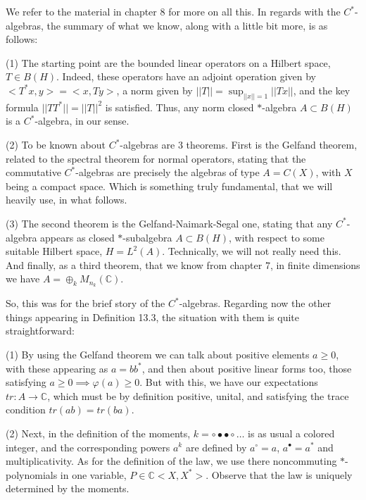 \documentclass[12pt]{amsbook}
\begin{document}
We refer to the material in chapter 8 for more on all this. In regards with the $C^*$-algebras, the summary of what we know, along with a little bit more, is as follows:

\bigskip

(1) The starting point are the bounded linear operators on a Hilbert space, $T\in B(H)$. Indeed, these operators have an adjoint operation given by $<T^*x,y>=<x,Ty>$, a norm given by $||T||=\sup_{||x||=1}||Tx||$, and the key formula $||TT^*||=||T||^2$ is satisfied. Thus, any norm closed $*$-algebra $A\subset B(H)$ is a $C^*$-algebra, in our sense.

\bigskip

(2) To be known about $C^*$-algebras are 3 theorems. First is the Gelfand theorem, related to the spectral theorem for normal operators, stating that the commutative $C^*$-algebras are precisely the algebras of type $A=C(X)$, with $X$ being a compact space. Which is something truly fundamental, that we will heavily use, in what follows.

\bigskip

(3) The second theorem is the Gelfand-Naimark-Segal one, stating that any $C^*$-algebra appears as closed $*$-subalgebra $A\subset B(H)$, with respect to some suitable Hilbert space, $H=L^2(A)$. Technically, we will not really need this. And finally, as a third theorem, that we know from chapter 7, in finite dimensions we have $A=\oplus_kM_{n_k}(\mathbb C)$.

\bigskip

So, this was for the brief story of the $C^*$-algebras. Regarding now the other things appearing in Definition 13.3, the situation with them is quite straightforward: 

\bigskip

(1) By using the Gelfand theorem we can talk about positive elements $a\geq0$, with these appearing as $a=bb^*$, and then about positive linear forms too, those satisfying $a\geq0\implies\varphi(a)\geq0$. But with this, we have our expectations $tr:A\to\mathbb C$, which must be by definition positive, unital, and satisfying the trace condition $tr(ab)=tr(ba)$.

\bigskip

(2) Next, in the definition of the moments, $k=\circ\bullet\bullet\circ\ldots$ is as usual a colored integer, and the corresponding powers $a^k$ are defined by $a^\circ=a$, $a^\bullet=a^*$ and multiplicativity. As for the definition of the law, we use there noncommuting $*$-polynomials in one variable, $P\in\mathbb C<X,X^*>$. Observe that the law is uniquely determined by the moments.
\end{document}
